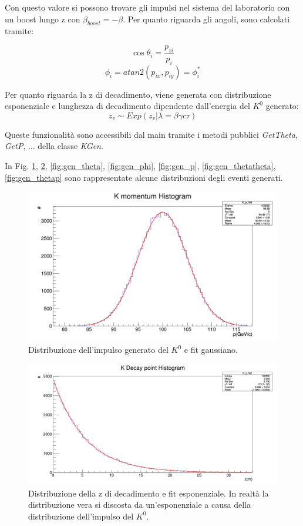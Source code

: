 \documentclass[8pt]{extarticle}
\begin{document}
Con questo valore si possono trovare gli impulsi nel sistema del laboratorio con un boost lungo z con $\beta_{boost} = -\beta$. 
Per quanto riguarda gli angoli, sono calcolati tramite: 

$$
\cos{\theta_i} = \frac{p_{zi}}{p_i}
$$
$$
\phi_i = atan2(p_{ix}, p_{iy}) = \phi_i^*
$$

Per quanto riguarda la z di decadimento, viene generata con distribuzione esponenziale e lunghezza di decadimento dipendente dall'energia del $K^0$ generato:
$$
z_v \sim Exp(z_v | \lambda = \beta\gamma c \tau)
$$

Queste funzionalità sono accessibili dal main tramite i metodi pubblici \textit{GetTheta}, \textit{GetP}, ... della classe \textit{KGen}.

In Fig. \ref{fig:gen_pK}, \ref{fig:gen_z}, \ref{fig:gen_theta}, \ref{fig:gen_phi}, \ref{fig:gen_p}, \ref{fig:gen_thetatheta}, \ref{fig:gen_thetap} sono rappresentate alcune distribuzioni degli eventi generati.

\begin{figure}
	\begin{center}
		\includegraphics[scale=0.3]{gen_pK} 
		\caption{Distribuzione dell'impulso generato del $K^0$ e fit gaussiano.}
		\label{fig:gen_pK}
	\end{center}
\end{figure}

\begin{figure}
	\begin{center}
		\includegraphics[scale=0.3]{gen_z} 
		\caption{Distribuzione della z di decadimento e fit esponenziale. In realtà la distribuzione vera si discosta da un'esponenziale a causa della distribuzione dell'impulso del $K^0$.}
		\label{fig:gen_z}
	\end{center}
\end{figure}
\end{document}
